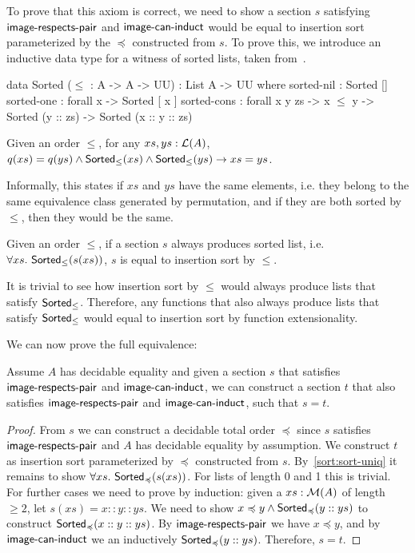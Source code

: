 To prove that this axiom is correct, we need to show a section $s$ satisfying
$\operatorname{\mathsf{image-respects-pair}}$ and $\operatorname{\mathsf{image-can-induct}}$ would be equal to insertion sort parameterized by
the $\preccurlyeq$ constructed from $s$. To prove this, we introduce an inductive data type
for a witness of sorted lists, taken from~\cite{appelVerifiedFunctionalAlgorithms2023}.

\begin{code}
data Sorted ($\leq$ : A -> A -> UU) : List A -> UU where
  sorted-nil : Sorted []
  sorted-one : forall x -> Sorted [ x ]
  sorted-cons : forall x y zs -> x $\leq$ y -> Sorted (y :: zs) -> Sorted (x :: y :: zs)
\end{code}

\begin{proposition}
    Given an order $\leq$, for any $xs, ys : \mathcal{L}(A)$,
    $q(xs) = q(ys) \land \operatorname{\mathsf{Sorted}}_{\leq}(xs) \land \operatorname{\mathsf{Sorted}}_{\leq}(ys) \to xs = ys$.
\end{proposition}

Informally, this states if $xs$ and $ys$ have the same elements, i.e. they belong to the same
equivalence class generated by permutation, and if they are both sorted by $\leq$, then they would be the same.

\begin{corollary}\label{sort:sort-uniq}
    Given an order $\leq$,
    if a section $s$ always produces sorted list, i.e. $\forall xs.\,\operatorname{\mathsf{Sorted}}_{\leq}(s(xs))$,
    $s$ is equal to insertion sort by $\leq$.
\end{corollary}
It is trivial to see how insertion sort by $\leq$ would always produce lists that satisfy
$\operatorname{\mathsf{Sorted}}_{\leq}$. Therefore, any functions that also always produce lists that satisfy
$\operatorname{\mathsf{Sorted}}_{\leq}$ would equal to insertion sort by function extensionality.

We can now prove the full equivalence:
\begin{proposition}\label{sort:s2o2s}
Assume $A$ has decidable equality and given a section $s$ that satisfies $\operatorname{\mathsf{image-respects-pair}}$ and $\operatorname{\mathsf{image-can-induct}}$, 
we can construct a section $t$ that also satisfies $\operatorname{\mathsf{image-respects-pair}}$ and $\operatorname{\mathsf{image-can-induct}}$, such that $s = t$.
\end{proposition}
\begin{proof}
    From $s$ we can construct a decidable total order $\preccurlyeq$ since $s$ satisfies
    $\operatorname{\mathsf{image-respects-pair}}$ and $A$ has decidable equality by assumption.
    We construct $t$ as insertion sort parameterized by $\preccurlyeq$ constructed from $s$.
    By~\ref{sort:sort-uniq} it remains to show $\forall xs.\,\operatorname{\mathsf{Sorted}}_{\preccurlyeq}(s(xs))$.
    For lists of length 0 and 1 this is trivial. For further cases we need to prove by induction:
    given a $xs : \mathcal{M}(A)$ of length $\geq 2$, let $s(xs) = x :: y :: ys$. We need to show
    $x \preccurlyeq y \land \operatorname{\mathsf{Sorted}}_{\preccurlyeq}(y :: ys)$ to construct
    $\operatorname{\mathsf{Sorted}}_{\preccurlyeq}(x :: y :: ys)$.
    By $\operatorname{\mathsf{image-respects-pair}}$ we have $x \preccurlyeq y$, and by $\operatorname{\mathsf{image-can-induct}}$ we an
    inductively $\operatorname{\mathsf{Sorted}}_{\preccurlyeq}(y :: ys)$.
    Therefore, $s = t$.
\end{proof}

